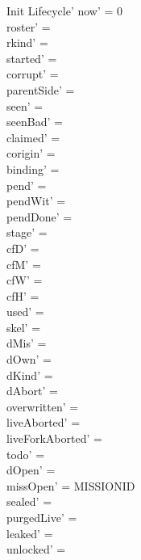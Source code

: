 \documentclass[a4paper,10pt,fleqn]{article}
\begin{document}
\begin{schema}{Init}
Lifecycle'
\where
now' = 0 \\
roster' = \emptyset \\
rkind' = \emptyset \\
started' = \emptyset \\
corrupt' = \emptyset \\
parentSide' = \emptyset \\
seen' = \emptyset \\
seenBad' = \emptyset \\
claimed' = \emptyset \\
corigin' = \emptyset \\
binding' = \emptyset \\
pend' = \emptyset \\
pendWit' = \emptyset \\
pendDone' = \emptyset \\
stage' = \emptyset \\
cfD' = \emptyset \\
cfM' = \emptyset \\
cfW' = \emptyset \\
cfH' = \emptyset \\
used' = \emptyset \\
skel' = \emptyset \\
dMis' = \emptyset \\
dOwn' = \emptyset \\
dKind' = \emptyset \\
dAbort' = \emptyset \\
overwritten' = \emptyset \\
liveAborted' = \emptyset \\
liveForkAborted' = \emptyset \\
todo' = \emptyset \\
dOpen' = \emptyset \\
missOpen' = MISSIONID \\
sealed' = \emptyset \\
purgedLive' = \emptyset \\
leaked' = \emptyset \\
unlocked' = \emptyset
\end{schema}
\end{document}
